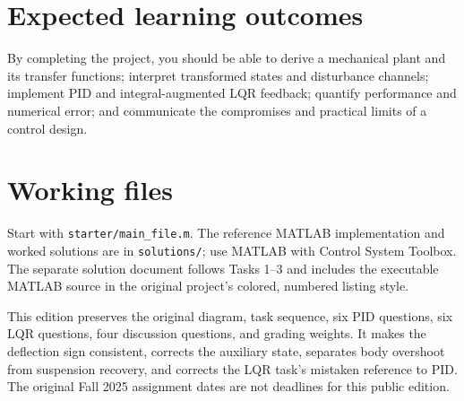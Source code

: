 \section*{Expected learning outcomes}
By completing the project, you should be able to derive a mechanical plant and its
transfer functions; interpret transformed states and disturbance channels; implement
PID and integral-augmented LQR feedback; quantify performance and numerical error;
and communicate the compromises and practical limits of a control design.
\section*{Working files}
Start with \texttt{starter/main\_file.m}. The reference MATLAB implementation and
worked solutions are in \texttt{solutions/}; use MATLAB with Control System Toolbox.
The separate solution document follows Tasks 1--3 and includes the executable MATLAB
source in the original project's colored, numbered listing style.
\begin{tcolorbox}[colback=gray!5,colframe=gray!55,title=Corrections to the original offering]
This edition preserves the original diagram, task sequence, six PID questions,
six LQR questions, four discussion questions, and grading weights. It makes the
deflection sign consistent, corrects the auxiliary state, separates body overshoot
from suspension recovery, and corrects the LQR task's mistaken reference to PID.
The original Fall 2025 assignment dates are not deadlines for this public edition.
\end{tcolorbox}

